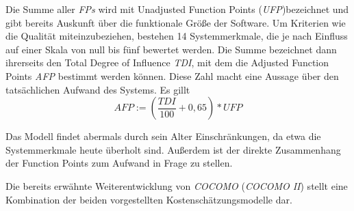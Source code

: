 Die Summe aller \textit{FPs} wird mit Unadjusted Function Points (\textit{UFP})bezeichnet und gibt bereits Auskunft über die funktionale Größe der Software. Um Kriterien wie die Qualität miteinzubeziehen, bestehen 14 Systemmerkmale, die je nach Einfluss auf einer Skala von null bis fünf bewertet werden. Die Summe bezeichnet dann ihrerseits den Total Degree of Influence \textit{TDI}, mit dem die Adjusted Function Points \textit{AFP} bestimmt werden können. Diese Zahl macht eine Aussage über den tatsächlichen Aufwand des Systems. Es gillt 
$$AFP := \left (\frac{TDI}{100}+0,65 \right ) * UFP$$

Das Modell findet abermals durch sein Alter Einschränkungen, da etwa die Systemmerkmale heute überholt sind. Außerdem ist der direkte Zusammenhang der Function Points zum Aufwand in Frage zu stellen.

Die bereits erwähnte Weiterentwicklung von \textit{COCOMO} (\textit{COCOMO II}) stellt eine Kombination der beiden vorgestellten Kostenschätzungsmodelle dar.